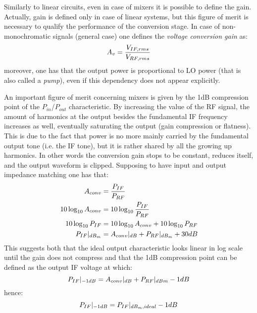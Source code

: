 Similarly to linear circuits, even in case of mixers it is possible to define the gain. Actually, gain is defined only in case of linear systems, but this figure of merit is necessary to qualify the performance of the conversion stage.
In case of non-monochromatic signals (general case) one defines the \emph{voltage conversion gain} as:
\begin{equation}
	A_v= \frac{V_{IF,rms}}{V_{RF,rms}} \notag
\end{equation}
moreover, one has that the output power is proportional to LO power (that is also called a \emph{pump}), even if this dependency does not appear explicitly.

An important figure of merit concerning mixers is given by the 1dB compression point of the $P_{in}$/$P_{out}$ characteristic. By increasing the value of the RF signal, the amount of harmonics at the output besides the fundamental IF frequency increases as well, eventually saturating the output (gain compression or flatness). This is due to the fact that power is no more mainly carried by the fundamental output tone (i.e. the IF tone), but it is rather shared by all the growing up harmonics. In other words the conversion gain stops to be constant, reduces itself, and the output waveform is clipped. Supposing to have input and output impedance matching one has that:
\begin{align}
	A_{conv}&=\frac{P_{IF}}{P_{RF}} \notag \\
	10\log_{10}A_{conv} & = 10\log_{10}\frac{P_{IF}}{P_{RF}}  \notag \\
	10\log_{10}P_{IF} & = 10\log_{10}A_{conv} + 10\log_{10}P_{RF} \notag \\	P_{IF}|_{dB_{m}} &= A_{conv}|_{dB} + P_{RF}|_{dB_{m}}+30dB \notag
\end{align}
This suggests both that the ideal output characteristic looks linear in log scale until the gain does not compress and that the 1dB compression point can be defined as the output IF voltage at which:
\begin{equation}
P_{IF}|_{-1dB} = A_{conv}|_{dB} + P_{RF}|_{dBm} -1dB \notag
\end{equation}
hence:
\begin{equation}
P_{IF}|_{-1dB} = P_{IF}|_{dB_{m},ideal} -1dB \notag
\end{equation}

